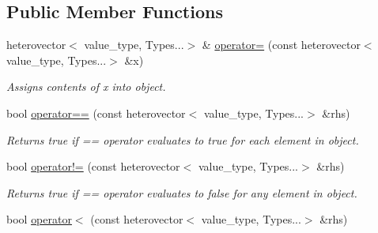 \subsection*{Public Member Functions}
\begin{DoxyCompactItemize}
\item 
\hypertarget{classheterogeneous_1_1heterovector_3_01_t_00_01_types_8_8_8_4_a782722854795eda170c026eebffdcd14}{}heterovector$<$ value\+\_\+type, Types...$>$ \& \hyperlink{classheterogeneous_1_1heterovector_3_01_t_00_01_types_8_8_8_4_a782722854795eda170c026eebffdcd14}{operator=} (const heterovector$<$ value\+\_\+type, Types...$>$ \&x)\label{classheterogeneous_1_1heterovector_3_01_t_00_01_types_8_8_8_4_a782722854795eda170c026eebffdcd14}

\begin{DoxyCompactList}\small\item\em Assigns contents of x into object. \end{DoxyCompactList}\item 
\hypertarget{classheterogeneous_1_1heterovector_3_01_t_00_01_types_8_8_8_4_a685270ed3cd01d0a8c65f42056f772d6}{}bool \hyperlink{classheterogeneous_1_1heterovector_3_01_t_00_01_types_8_8_8_4_a685270ed3cd01d0a8c65f42056f772d6}{operator==} (const heterovector$<$ value\+\_\+type, Types...$>$ \&rhs)\label{classheterogeneous_1_1heterovector_3_01_t_00_01_types_8_8_8_4_a685270ed3cd01d0a8c65f42056f772d6}

\begin{DoxyCompactList}\small\item\em Returns true if == operator evaluates to true for each element in object. \end{DoxyCompactList}\item 
\hypertarget{classheterogeneous_1_1heterovector_3_01_t_00_01_types_8_8_8_4_a26551ddb377bf4d7c0d8c1f3d4cb9eae}{}bool \hyperlink{classheterogeneous_1_1heterovector_3_01_t_00_01_types_8_8_8_4_a26551ddb377bf4d7c0d8c1f3d4cb9eae}{operator!=} (const heterovector$<$ value\+\_\+type, Types...$>$ \&rhs)\label{classheterogeneous_1_1heterovector_3_01_t_00_01_types_8_8_8_4_a26551ddb377bf4d7c0d8c1f3d4cb9eae}

\begin{DoxyCompactList}\small\item\em Returns true if == operator evaluates to false for any element in object. \end{DoxyCompactList}\item 
\hypertarget{classheterogeneous_1_1heterovector_3_01_t_00_01_types_8_8_8_4_a86ae429dcc32d5c6767fed384b942f20}{}bool \hyperlink{classheterogeneous_1_1heterovector_3_01_t_00_01_types_8_8_8_4_a86ae429dcc32d5c6767fed384b942f20}{operator$<$} (const heterovector$<$ value\+\_\+type, Types...$>$ \&rhs)\label{classheterogeneous_1_1heterovector_3_01_t_00_01_types_8_8_8_4_a86ae429dcc32d5c6767fed384b942f20}


\end{DoxyCompactItemize}
